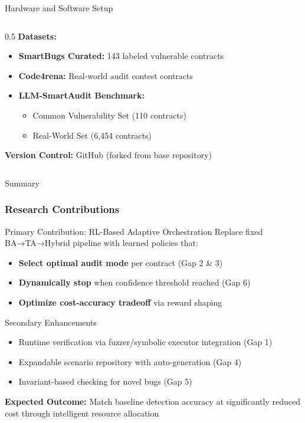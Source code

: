 \documentclass[aspectratio=169]{beamer}
\begin{document}
\begin{frame}{Hardware and Software Setup}
\begin{columns}[T]
\begin{column}{0.5\textwidth}
\textbf{Datasets:}
\begin{itemize}
    \item \textbf{SmartBugs Curated:} 143 labeled vulnerable contracts
    \item \textbf{Code4rena:} Real-world audit contest contracts
    \item \textbf{LLM-SmartAudit Benchmark:}
    \begin{itemize}
        \item Common Vulnerability Set (110 contracts)
        \item Real-World Set (6,454 contracts)
    \end{itemize}
\end{itemize}

\vspace{0.3cm}

\textbf{Version Control:} GitHub (forked from base repository)
\end{column}
\end{columns}

\end{frame}

\begin{frame}{Summary}
\frametitle{Research Contributions}

\begin{block}{Primary Contribution: RL-Based Adaptive Orchestration}
Replace fixed BA→TA→Hybrid pipeline with learned policies that:
\begin{itemize}
    \item \textbf{Select optimal audit mode} per contract (Gap 2 \& 3)
    \item \textbf{Dynamically stop} when confidence threshold reached (Gap 6)
    \item \textbf{Optimize cost-accuracy tradeoff} via reward shaping
\end{itemize}
\end{block}

\vspace{0.3cm}

\begin{block}{Secondary Enhancements}
\begin{itemize}
    \item Runtime verification via fuzzer/symbolic executor integration (Gap 1)
    \item Expandable scenario repository with auto-generation (Gap 4)
    \item Invariant-based checking for novel bugs (Gap 5)
\end{itemize}
\end{block}

\vspace{0.3cm}

\textbf{Expected Outcome:} Match baseline detection accuracy at significantly reduced cost through intelligent resource allocation

\end{frame}
\end{document}
